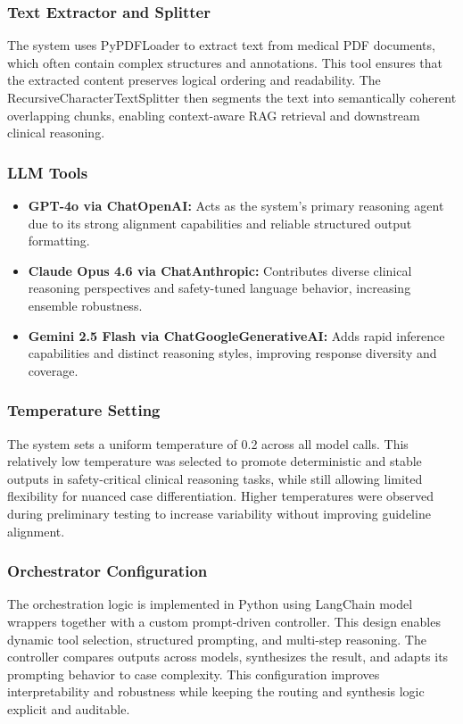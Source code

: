 \documentclass[preprint,12pt]{elsarticle}
\begin{document}
\subsubsection{Text Extractor and Splitter}
The system uses PyPDFLoader to extract text from medical PDF documents, which often contain complex structures and annotations. This tool ensures that the extracted content preserves logical ordering and readability. The RecursiveCharacterTextSplitter then segments the text into semantically coherent overlapping chunks, enabling context-aware RAG retrieval and downstream clinical reasoning.

\subsubsection{LLM Tools}
\begin{itemize}
    \item \textbf{GPT-4o via ChatOpenAI:} Acts as the system's primary reasoning agent due to its strong alignment capabilities and reliable structured output formatting.
    \item \textbf{Claude Opus 4.6 via ChatAnthropic:} Contributes diverse clinical reasoning perspectives and safety-tuned language behavior, increasing ensemble robustness.
    \item \textbf{Gemini 2.5 Flash via ChatGoogleGenerativeAI:} Adds rapid inference capabilities and distinct reasoning styles, improving response diversity and coverage.
\end{itemize}

\subsubsection{Temperature Setting}
The system sets a uniform temperature of 0.2 across all model calls. This relatively low temperature was selected to promote deterministic and stable outputs in safety-critical clinical reasoning tasks, while still allowing limited flexibility for nuanced case differentiation. Higher temperatures were observed during preliminary testing to increase variability without improving guideline alignment.


\subsubsection{Orchestrator Configuration}
The orchestration logic is implemented in Python using LangChain model wrappers together with a custom prompt-driven controller. This design enables dynamic tool selection, structured prompting, and multi-step reasoning. The controller compares outputs across models, synthesizes the result, and adapts its prompting behavior to case complexity. This configuration improves interpretability and robustness while keeping the routing and synthesis logic explicit and auditable.
\end{document}
